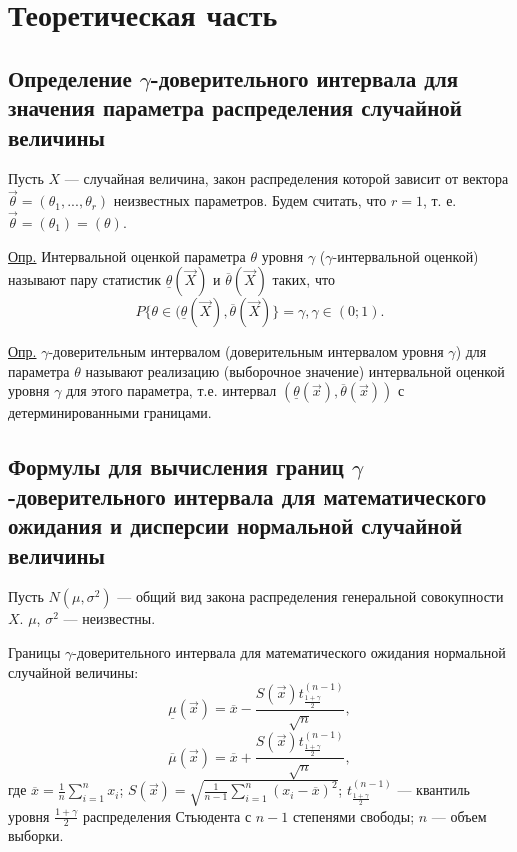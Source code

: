 \documentclass[12pt]{report}
\begin{document}
\chapter{Теоретическая часть}

\section{Определение $\gamma$-доверительного интервала для значения параметра распределения случайной величины}

Пусть $X$ --- случайная величина, закон распределения которой зависит от вектора $\vec \theta = (\theta_{1}, ..., \theta_{r})$ неизвестных параметров. Будем считать, что $r = 1$, т. е. $\vec \theta = (\theta_{1}) = (\theta)$.

\underline{Опр.} Интервальной оценкой параметра $\theta$ уровня $\gamma$ ($\gamma$-интервальной оценкой) называют пару статистик $\underline{\theta}(\vec X)$ и $\overline{\theta}(\vec X)$ таких, что
\begin{equation}
	P\{\theta \in (\underline{\theta}(\vec X), \overline{\theta}(\vec X)\} = \gamma, \gamma \in (0;1).
\end{equation}

\underline{Опр.} $\gamma$-доверительным интервалом (доверительным интервалом уровня $\gamma$) для параметра $\theta$ называют реализацию (выборочное значение) интервальной оценкой уровня $\gamma$ для этого параметра, т.е. интервал $(\underline{\theta}(\vec x), \overline{\theta}(\vec x))$ с детерминированными границами.

\section{Формулы для вычисления границ \newline$\gamma$-доверительного интервала для математического ожидания и дисперсии нормальной случайной величины}

Пусть $N(\mu, \sigma^2)$ --- общий вид закона распределения генеральной совокупности $X$. $\mu$, $\sigma^2$ --- неизвестны. 

Границы $\gamma$-доверительного интервала для математического ожидания нормальной случайной величины:
\begin{equation}
	\underline{\mu}(\vec x) = \overline{x} - \frac{S(\vec x)t^{(n - 1)}_{\frac{1 + \gamma}{2}}}{\sqrt{n}},
\end{equation}
\begin{equation}
	\overline{\mu}(\vec x) = \overline{x} + \frac{S(\vec x)t^{(n - 1)}_{\frac{1 + \gamma}{2}}}{\sqrt{n}},
\end{equation}
где $\overline{x} = \frac{1}{n} \sum_{i=1}^n x_i$; $S(\vec x) = \sqrt{\frac{1}{n-1} \sum_{i=1}^n (x_i - \overline x)^2}$; $t^{(n - 1)}_{\frac{1 + \gamma}{2}}$ --- квантиль уровня $\frac{1 + \gamma}{2}$ распределения Стьюдента с $n - 1$ степенями свободы; $n$ --- объем выборки.
\end{document}
